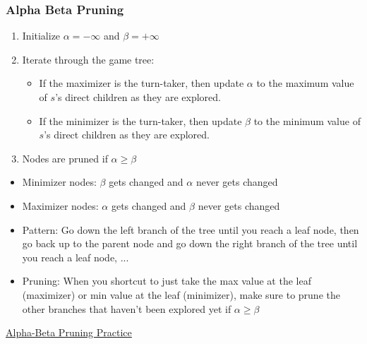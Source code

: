 \subsubsection{Alpha Beta Pruning}
\begin{process}
    \begin{enumerate}
        \item Initialize $\alpha = -\infty$ and $\beta = +\infty$
        \item Iterate through the game tree:
        \begin{itemize}
            \item If the maximizer is the turn-taker, then update $\alpha$ to the maximum value of $s$'s direct children as they are explored.
            \item If the minimizer is the turn-taker, then update $\beta$ to the minimum value of $s$'s direct children as they are explored.
        \end{itemize}
        \item Nodes are pruned if $\alpha \geq \beta$
    \end{enumerate}
\end{process}

\begin{warning}
    \begin{itemize}
        \item Minimizer nodes: $\beta$ gets changed and $\alpha$ never gets changed
        \item Maximizer nodes: $\alpha$ gets changed and $\beta$ never gets changed
        \item Pattern: Go down the left branch of the tree until you reach a leaf node, then go back up to the parent node and go down the right branch of the tree until you reach a leaf node, ...
        \item Pruning: When you shortcut to just take the max value at the leaf (maximizer) or min value at the leaf (minimizer), make sure to prune the other branches that haven't been explored yet if $\alpha \geq \beta$
    \end{itemize}

\end{warning}

\begin{example} \href{https://pascscha.ch/info2/abTreePractice/}{Alpha-Beta Pruning Practice}
\end{example}

\begin{example}
\end{example}